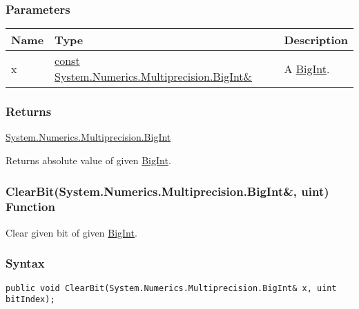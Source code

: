 \documentclass[a4paper,oneside,11.000000pt]{book}
\begin{document}
\subsubsection*{Parameters}
\begin{flushleft}
\begin{supertabular}[l]{!{\raggedright}p{1.30721cm}!{\raggedright}p{8.55945cm}!{\raggedright}p{2.65538cm}}
\textbf{Name}
& \textbf{Type}
& \textbf{Description}
\\
\hline
x
& \hyperlink{System.Numerics.Multiprecision.BigInt}{const System.\-Numerics.\-Multiprecision.\-BigInt\&\-}
& A \hyperlink{System.Numerics.Multiprecision.BigInt}{BigInt}.

\\
\end{supertabular}

\end{flushleft}
\subsubsection*{Returns}
\hyperlink{System.Numerics.Multiprecision.BigInt}{System.\-Numerics.\-Multiprecision.\-BigInt}
\begin{flushleft}
Returns absolute value of given \hyperlink{System.Numerics.Multiprecision.BigInt}{BigInt}.

\end{flushleft}
\clearpage

\hypertarget{System.Numerics.Multiprecision.ClearBit.R.System.Numerics.Multiprecision.BigInt.uint}{\subsubsection*{ClearBit(System.Numerics.Multiprecision.BigInt\&, uint) Function}}
\begin{flushleft}
Clear given bit of given \hyperlink{System.Numerics.Multiprecision.BigInt}{BigInt}.

\end{flushleft}
\subsubsection*{Syntax}
\texttt{public void ClearBit(System.Numerics.Multiprecision.BigInt\& x, uint bitIndex);}
\end{document}
